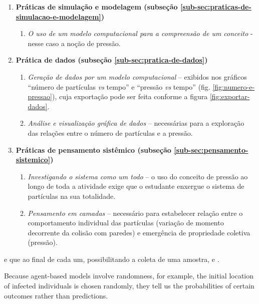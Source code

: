 \begin{enumerate}

  \item \textbf{Práticas de simulação e modelagem (subseção \ref{sub-sec:praticas-de-simulacao-e-modelagem})}
    \begin{enumerate}
      \item \textit{O uso de um modelo computacional para a compreensão de um conceito} - nesse caso a noção de pressão.
    \end{enumerate}

  \item \textbf{Prática de dados (subseção \ref{sub-sec:pratica-de-dados})}
    \begin{enumerate}
      \item \textit{Geração de dados por um modelo computacional} -- exibidos nos gráficos ``número de partículas \textit{vs} tempo'' e ``pressão \textit{vs} tempo'' (fig. \ref{fig:numero-e-pressao}), cuja exportação pode ser feita conforme a figura \ref{fig:exportar-dados}.

      \item \textit{Análise e visualização gráfica de dados} -- necessárias para a exploração das relações entre o número de partículas e a pressão.
    \end{enumerate}

  \item \textbf{Práticas de pensamento sistêmico (subseção \ref{sub-sec:pensamento-sistemico})}

    \begin{enumerate}
      \item \textit{Investigando o sistema como um todo} -- o uso do conceito de pressão ao longo de toda a atividade exige que o estudante enxergue o sistema de partículas na sua totalidade.        
      \item \textit{Pensamento em camadas} -- necessário para estabelecer relação entre o comportamento individual das partículas (variação de momento decorrente da colisão com paredes) e emergência de propriedade coletiva (pressão).
    \end{enumerate}
  
\end{enumerate}






e que ao final de cada um, possibilitando a coleta de uma amostra, e .



Because agent-based models involve randomness, for example, the initial location of infected individuals is chosen randomly, they tell us the probabilities of certain outcomes rather than predictions.

